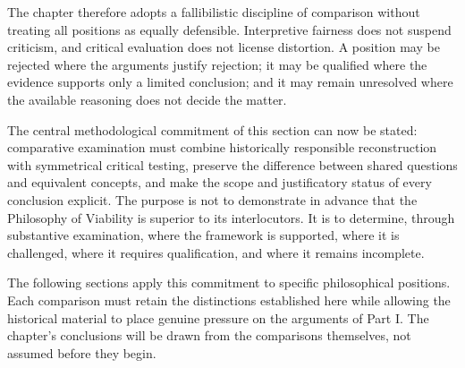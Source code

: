\label{para:VS.B01.P01.C08.S01.SS10.P004}
The chapter therefore adopts a fallibilistic
discipline of comparison without treating all
positions as equally defensible. Interpretive
fairness does not suspend criticism, and critical
evaluation does not license distortion. A position
may be rejected where the arguments justify
rejection; it may be qualified where the evidence
supports only a limited conclusion; and it may
remain unresolved where the available reasoning
does not decide the matter.

\label{para:VS.B01.P01.C08.S01.SS10.P005}
The central methodological commitment of this
section can now be stated: comparative examination
must combine historically responsible reconstruction
with symmetrical critical testing, preserve the
difference between shared questions and equivalent
concepts, and make the scope and justificatory
status of every conclusion explicit. The purpose
is not to demonstrate in advance that the
Philosophy of Viability is superior to its
interlocutors. It is to determine, through
substantive examination, where the framework is
supported, where it is challenged, where it
requires qualification, and where it remains
incomplete.

\label{para:VS.B01.P01.C08.S01.SS10.P006}
The following sections apply this commitment to
specific philosophical positions. Each comparison
must retain the distinctions established here
while allowing the historical material to place
genuine pressure on the arguments of Part I.
The chapter's conclusions will be drawn from the
comparisons themselves, not assumed before they
begin.

